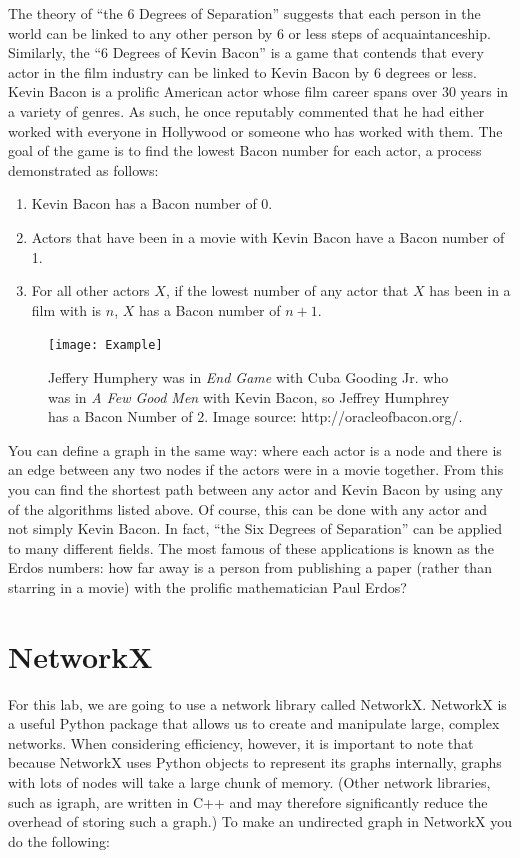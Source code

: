 The theory of ``the 6 Degrees of Separation'' suggests that each person in the world can be linked to any other person by 6 or less steps of acquaintanceship.
Similarly, the ``6 Degrees of Kevin Bacon'' is a game that contends that every actor in the film industry can be linked to Kevin Bacon by 6 degrees or less. Kevin Bacon is a prolific American actor whose film career spans over 30 years in a variety of genres. As such, he once reputably commented that he had either worked with everyone in Hollywood or someone who has worked with them. The goal of the game is to find the lowest Bacon number for each actor, a process demonstrated as follows:
\begin{enumerate}
\item Kevin Bacon has a Bacon number of 0.
\item Actors that have been in a movie with Kevin Bacon have a Bacon number of 1.
\item For all other actors $X$, if the lowest number of any actor that $X$ has been in a film with is $n$, $X$ has a Bacon number of $n+1$.
\end{enumerate}

\begin{figure}[h]
\texttt{[image: Example]}
\caption{Jeffery Humphery was in \emph{End Game} with Cuba Gooding Jr. who was in \emph{A Few Good Men} with Kevin Bacon, so Jeffrey Humphrey has a Bacon Number of 2.  Image source: http://oracleofbacon.org/.}
\end{figure}

You can define a graph in the same way: where each actor is a node and there is an edge between any two nodes if the actors were in a movie together. From this you can find the shortest path between any actor and Kevin Bacon by using any of the algorithms listed above. Of course, this can be done with any actor and not simply Kevin Bacon. In fact, ``the Six Degrees of Separation'' can be applied to many different fields. The most famous of these applications is known as the Erdos numbers: how far away is a person from publishing a paper (rather than starring in a movie) with the prolific mathematician Paul Erdos?

\section*{NetworkX}
For this lab, we are going to use a network library called NetworkX. NetworkX is a useful Python package that allows us to create and manipulate large, complex networks.  When considering efficiency, however, it is important to note that because NetworkX uses Python objects to represent its graphs internally, graphs with lots of nodes will take a large chunk of memory.  (Other network libraries, such as igraph, are written in C++ and may therefore significantly reduce the overhead of storing such a graph.)
To make an undirected graph in NetworkX you do the following:

